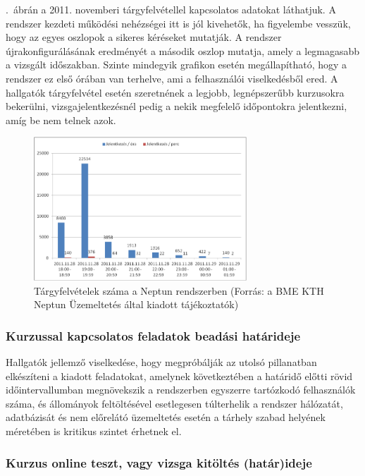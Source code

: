 .~ábrán a 2011. novemberi tárgyfelvétellel kapcsolatos adatokat láthatjuk. A rendszer kezdeti működési nehézségei itt is jól kivehetők, ha figyelembe vesszük, hogy az egyes oszlopok a sikeres kéréseket mutatják. A rendszer újrakonfigurálásának eredményét a második oszlop mutatja, amely a legmagasabb a vizsgált időszakban.
Szinte mindegyik grafikon esetén megállapítható, hogy a rendszer ez első órában van terhelve, ami a felhasználói viselkedésből ered. A hallgatók tárgyfelvétel esetén szeretnének a legjobb, legnépszerűbb kurzusokra bekerülni, vizsgajelentkezésnél pedig a nekik megfelelő időpontokra jelentkezni, amíg be nem telnek azok.

\begin{figure}[!h]
\centering
\includegraphics[width=80mm, keepaspectratio]{figures/neptun_005.png}
\caption{Tárgyfelvételek száma a Neptun rendszerben (Forrás: a BME KTH Neptun Üzemeltetés által kiadott tájékoztatók)}
\label{fig:neptun_005}
\end{figure}

\subsubsection{Kurzussal kapcsolatos feladatok beadási határideje}

Hallgatók jellemző viselkedése, hogy megpróbálják az utolsó pillanatban elkészíteni a kiadott feladatokat, amelynek következtében a határidő előtti rövid időintervallumban megnövekszik a rendszerben egyszerre tartózkodó felhasználók száma, és állományok feltöltésével esetlegesen túlterhelik a rendszer hálózatát, adatbázisát és nem előrelátó üzemeltetés esetén a tárhely szabad helyének méretében is kritikus szintet érhetnek el.

\subsubsection{Kurzus online teszt, vagy vizsga kitöltés (határ)ideje}

